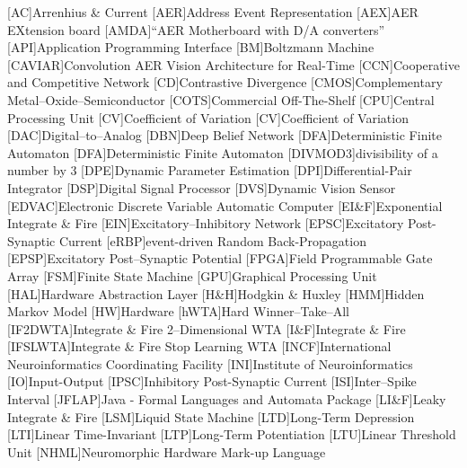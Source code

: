[AC]{Arrenhius \& Current}
[AER]{Address Event Representation}
[AEX]{AER EXtension board}
[AMDA]{``AER Motherboard with D/A converters''}
[API]{Application Programming Interface}
[BM]{Boltzmann Machine}
[CAVIAR]{Convolution AER Vision Architecture for Real-Time}
[CCN]{Cooperative and Competitive Network}
[CD]{Contrastive Divergence}
[CMOS]{Complementary Metal--Oxide--Semiconductor}
[COTS]{Commercial Off-The-Shelf}
[CPU]{Central Processing Unit}
[CV]{Coefficient of Variation}
[CV]{Coefficient of Variation}
[DAC]{Digital--to--Analog}
[DBN]{Deep Belief Network}
[DFA]{Deterministic Finite Automaton}
[DFA]{Deterministic Finite Automaton}
[DIVMOD3]{divisibility of a number by 3}
[DPE]{Dynamic Parameter Estimation}
[DPI]{Differential-Pair Integrator}
[DSP]{Digital Signal Processor}
[DVS]{Dynamic Vision Sensor}
[EDVAC]{Electronic Discrete Variable Automatic Computer}
[EI\&F]{Exponential Integrate \& Fire}
[EIN]{Excitatory--Inhibitory Network}
[EPSC]{Excitatory Post-Synaptic Current}
[eRBP]{event-driven Random Back-Propagation}
[EPSP]{Excitatory Post--Synaptic Potential}
[FPGA]{Field Programmable Gate Array}
[FSM]{Finite State Machine}
[GPU]{Graphical Processing Unit}
[HAL]{Hardware Abstraction Layer}
[H\&H]{Hodgkin \& Huxley}
[HMM]{Hidden Markov Model}
[HW]{Hardware}
[hWTA]{Hard Winner--Take--All}
[IF2DWTA]{Integrate \& Fire 2--Dimensional WTA}
[I\&F]{Integrate \& Fire}
[IFSLWTA]{Integrate \& Fire Stop Learning WTA}
[INCF]{International Neuroinformatics Coordinating Facility}
[INI]{Institute of Neuroinformatics}
[IO]{Input-Output}
[IPSC]{Inhibitory Post-Synaptic Current}
[ISI]{Inter--Spike Interval}
[JFLAP]{Java - Formal Languages and Automata Package}
[LI\&F]{Leaky Integrate \& Fire}
[LSM]{Liquid State Machine}
[LTD]{Long-Term Depression}
[LTI]{Linear Time-Invariant}
[LTP]{Long-Term Potentiation}
[LTU]{Linear Threshold Unit}
[NHML]{Neuromorphic Hardware Mark-up Language}
